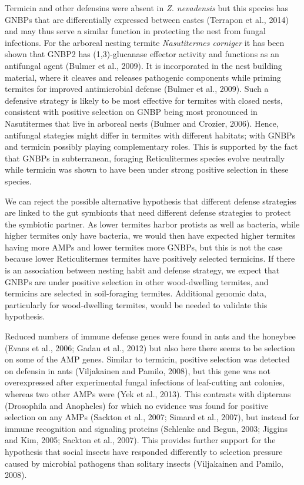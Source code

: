 \documentclass[11pt]{article}
\begin{document}
\begin{sloppypar}
Termicin and other defensins were absent in \textit{Z. nevadensis} but this species has GNBPs that are differentially expressed between castes (Terrapon et al., 2014) and may thus serve a similar function in protecting the nest from fungal infections. 
For the arboreal nesting termite \textit{Nasutitermes corniger} it has been shown that GNBP2 has (1,3)-glucanase effector activity and functions as an antifungal agent (Bulmer et al., 2009). 
It is incorporated in the nest building material, where it cleaves and releases pathogenic components while priming termites for improved antimicrobial defense (Bulmer et al., 2009). 
Such a defensive strategy is likely to be most effective for termites with closed nests, consistent with positive selection on GNBP being most pronounced in Nasutitermes that live in arboreal nests (Bulmer and Crozier, 2006). 
Hence, antifungal stategies might differ in termites with different habitats; with GNBPs and termicin possibly playing complementary roles. 
This is supported by the fact that GNBPs in subterranean, foraging Reticulitermes species evolve neutrally while termicin was shown to have been under strong positive selection in these species.
\par
We can reject the possible alternative hypothesis that different defense strategies are linked to the gut symbionts that need different defense strategies to protect the symbiotic partner. 
As lower termites harbor protists as well as bacteria, while higher termites only have bacteria, we would then have expected higher termites having more AMPs and lower termites more GNBPs, but this is not the case because lower Reticulitermes termites have positively selected termicins. 
If there is an association between nesting habit and defense strategy, we expect that GNBPs are under positive selection in other wood-dwelling termites, and termicins are selected in soil-foraging termites. 
Additional genomic data, particularly for wood-dwelling termites, would be needed to validate this hypothesis.
\par
Reduced numbers of immune defense genes were found in ants and the honeybee (Evans et al., 2006; Gadau et al., 2012) but also here there seems to be selection on some of the AMP genes. Similar to termicin, positive selection was detected on defensin in ants (Viljakainen and Pamilo, 2008), but this gene was not overexpressed after experimental fungal infections of leaf-cutting ant colonies, whereas two other AMPs were (Yek et al., 2013). This contrasts with dipterans (Drosophila and Anopheles) for which no evidence was found for positive selection on any AMPs (Sackton et al., 2007; Simard et al., 2007), but instead for immune recognition and signaling proteins (Schlenke and Begun, 2003; Jiggins and Kim, 2005; Sackton et al., 2007). This provides further support for the hypothesis that social insects have responded differently to selection pressure caused by microbial pathogens than solitary insects (Viljakainen and Pamilo, 2008).

\end{sloppypar}
\end{document}
